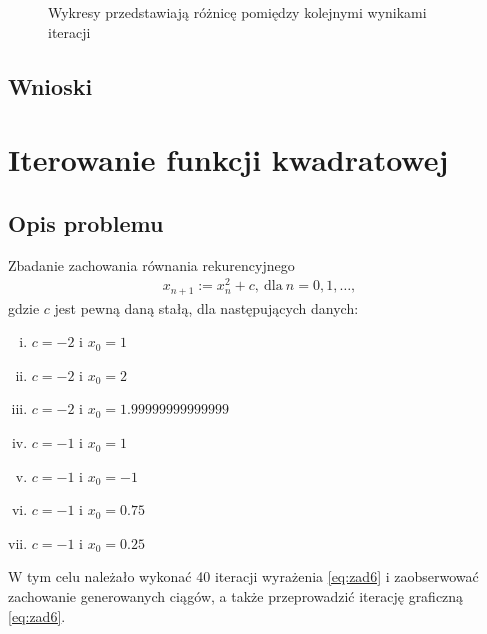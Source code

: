 \documentclass[11pt]{mk-polish-lab-report}
\begin{document}
\begin{figure}[h]
\centering
{}\hfill
{}\hfill
\caption{Wykresy przedstawiają różnicę pomiędzy kolejnymi wynikami iteracji} \label{fig:zad5}
\end{figure}

\subsection{Wnioski}

\section{Iterowanie funkcji kwadratowej}

\subsection{Opis problemu}

Zbadanie zachowania równania rekurencyjnego
\begin{align}
x_{n+1} := x^2_n + c, \ \textrm{dla} \ n = 0,1,\dots,
\label{eq:zad6}
\end{align}
gdzie $c$ jest pewną daną stałą, dla następujących danych:
\begin{enumerate}[(i)]
\item $c = -2$ i $x_0 = 1$
\item $c = -2$ i $x_0 = 2$
\item $c = -2$ i $x_0 = 1.99999999999999$
\item $c = -1$ i $x_0 = 1$
\item $c = -1$ i $x_0 = -1$
\item $c = -1$ i $x_0 = 0.75$
\item $c = -1$ i $x_0 = 0.25$
\end{enumerate}
W tym celu należało wykonać 40 iteracji wyrażenia \eqref{eq:zad6} i zaobserwować zachowanie generowanych ciągów, a także przeprowadzić iterację graficzną \eqref{eq:zad6}. 
\end{document}
